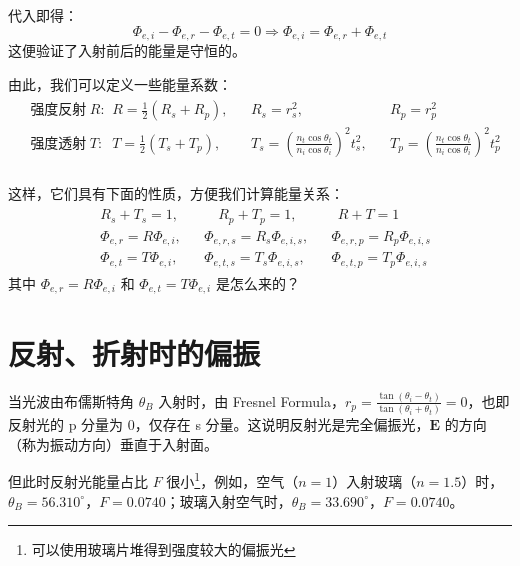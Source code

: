 \documentclass[UTF8]{report}
\theoremstyle{MyLineTheoremStyle} %
\theoremstyle{MyBlockTheoremStyle} %
\theoremstyle{MySubsubsectionStyle} %
\begin{document}
代入即得：
\begin{equation}
    \Phi_{e,i} - \Phi_{e,r} - \Phi_{e,t} = 0 \Longrightarrow  \Phi_{e,i} = \Phi_{e,r} + \Phi_{e,t}
\end{equation}
这便验证了入射前后的能量是守恒的。

由此，我们可以定义一些能量系数：
\begin{gather}
\begin{aligned}
    &\text{强度反射率 $R$: }\ &&R = \frac{1}{2}(R_s + R_p), &&R_s = r_s^2, && R_p = r_p^2 \\
    &\text{强度透射率 $T$: }\ &&T = \frac{1}{2}(T_s + T_p), &&T_s = \left( \frac{n_t \cos \theta_t}{n_i \cos \theta_i} \right)^2 t_s^2, && T_p = \left( \frac{n_t \cos \theta_t}{n_i \cos \theta_i} \right)^2 t_p^2 \\
\end{aligned}
\end{gather}

这样，它们具有下面的性质，方便我们计算能量关系：
\begin{gather}
\boxed{
\begin{aligned}
    &R_s + T_s = 1, &&\quad  R_p + T_p = 1,&&\ \  R + T = 1 \\ 
    &\Phi_{e,r} = R\Phi_{e,i}, && 
    \Phi_{e,r,s} = R_s\Phi_{e,i,s}, &&  \Phi_{e,r,p} = R_p\Phi_{e,i,s} 
    \\ 
    &\Phi_{e,t} = T\Phi_{e,i}, && \Phi_{e,t,s} = T_s\Phi_{e,i,s}, && \Phi_{e,t,p} = T_p\Phi_{e,i,s}
\end{aligned}
}
\end{gather}
{\color{red} 其中 $\Phi_{e,r} = R\Phi_{e,i}$ 和 $\Phi_{e,t} = T\Phi_{e,i}$ 是怎么来的？}


\section{反射、折射时的偏振}

当光波由布儒斯特角 $\theta_B$ 入射时，由 Fresnel Formula，$r_p = \frac{\tan (\theta_i - \theta_t)}{\tan (\theta_i + \theta_t)} = 0$，也即反射光的 p 分量为 0，仅存在 s 分量。这说明反射光是完全偏振光，$\boldsymbol{E}$ 的方向（称为振动方向）垂直于入射面。
{\par\color{gray}\small
但此时反射光能量占比 $F$ 很小\footnote{可以使用玻璃片堆得到强度较大的偏振光}，例如，空气（$n=1$）入射玻璃（$n = 1.5$）时，$\theta_B = 56.310^\circ$，$F =0.0740 $；玻璃入射空气时，$\theta_B = 33.690^\circ$，$F =0.0740 $。
\par}
\end{document}
